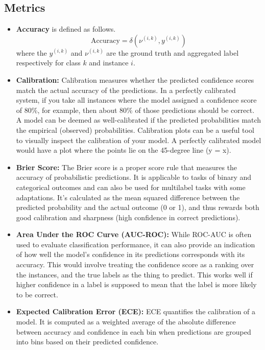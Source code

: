 \subsection{Metrics}
%
\begin{itemize}
\item \textbf{Accuracy} is defined as follows.
\begin{equation}
    \text{Accuracy}=\delta \left(\nu^{(i,k)}, y^{(i,k)} \right)
\end{equation}
where the $y^{(i,k)}$ and $\nu^{(i,k)}$ are the ground truth and aggregated label respectively for class $k$ and instance $i$.
%
\item \textbf{Calibration:} Calibration measures whether the predicted confidence scores match the actual accuracy of the predictions. In a perfectly calibrated system, if you take all instances where the model assigned a confidence score of 80\%, for example, then about 80\% of those predictions should be correct. A model can be deemed as well-calibrated if the predicted probabilities match the empirical (observed) probabilities. Calibration plots can be a useful tool to visually inspect the calibration of your model. A perfectly calibrated model would have a plot where the points lie on the 45-degree line (y = x).
%
\item \textbf{Brier Score:} The Brier score is a proper score rule that measures the accuracy of probabilistic predictions. It is applicable to tasks of binary and categorical outcomes and can also be used for multilabel tasks with some adaptations. It's calculated as the mean squared difference between the predicted probability and the actual outcome (0 or 1), and thus rewards both good calibration and sharpness (high confidence in correct predictions).
%
\item \textbf{Area Under the ROC Curve (AUC-ROC):} While ROC-AUC is often used to evaluate classification performance, it can also provide an indication of how well the model's confidence in its predictions corresponds with its accuracy. This would involve treating the confidence score as a ranking over the instances, and the true labels as the thing to predict. This works well if higher confidence in a label is supposed to mean that the label is more likely to be correct.
%
\item \textbf{Expected Calibration Error (ECE):} ECE quantifies the calibration of a model. It is computed as a weighted average of the absolute difference between accuracy and confidence in each bin when predictions are grouped into bins based on their predicted confidence.
\end{itemize}

